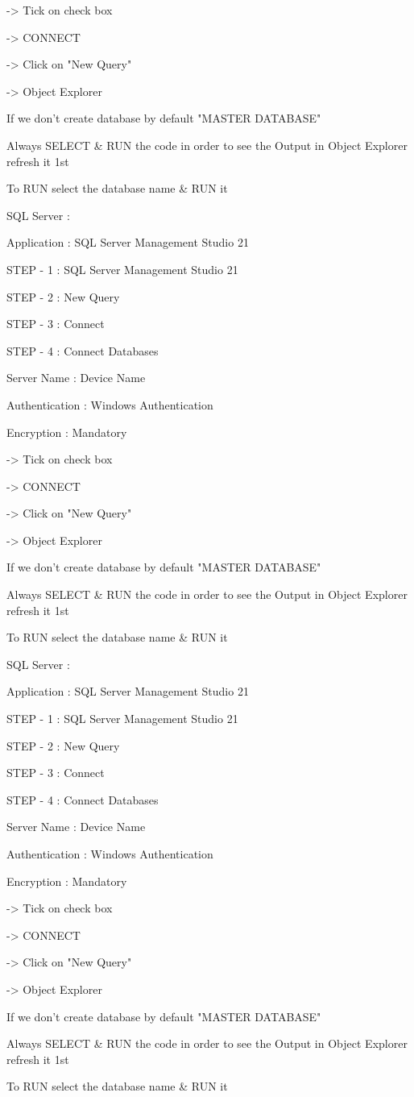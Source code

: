-> Tick on check box

-> CONNECT

-> Click on "New Query"

-> Object Explorer


If we don't create database by default "MASTER DATABASE"


Always SELECT & RUN the code in order to see the Output in Object Explorer refresh it 1st


To RUN select the database name & RUN it

SQL Server :

Application : SQL Server Management Studio 21

STEP - 1 : SQL Server Management Studio 21

STEP - 2 : New Query

STEP - 3 : Connect

STEP - 4 : Connect Databases


Server Name : Device Name

Authentication : Windows Authentication

Encryption : Mandatory

-> Tick on check box

-> CONNECT

-> Click on "New Query"

-> Object Explorer


If we don't create database by default "MASTER DATABASE"


Always SELECT & RUN the code in order to see the Output in Object Explorer refresh it 1st


To RUN select the database name & RUN it

SQL Server :

Application : SQL Server Management Studio 21

STEP - 1 : SQL Server Management Studio 21

STEP - 2 : New Query

STEP - 3 : Connect

STEP - 4 : Connect Databases


Server Name : Device Name

Authentication : Windows Authentication

Encryption : Mandatory

-> Tick on check box

-> CONNECT

-> Click on "New Query"

-> Object Explorer


If we don't create database by default "MASTER DATABASE"


Always SELECT & RUN the code in order to see the Output in Object Explorer refresh it 1st


To RUN select the database name & RUN it


